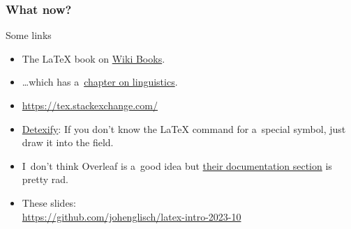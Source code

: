 \documentclass[a4paper,12pt]{beamer}
\begin{document}
\begin{frame}
  \frametitle{What now?}

  \begin{block}{Some links}
    \begin{itemize}
      \item The \LaTeX{} book on \href{https://en.wikibooks.org/wiki/LaTeX}{Wiki Books}.
      \item \dots{}which has a~\href{https://en.wikibooks.org/wiki/LaTeX/Linguistics}{chapter on linguistics}.
      \item \url{https://tex.stackexchange.com/}
      \item \href{https://detexify.kirelabs.org/classify.html}{Detexify}:
        If you don't know the \LaTeX{} command for a~special symbol, just draw
        it into the field.
      \item I~don't think Overleaf is a~good idea but
        \href{https://www.overleaf.com/learn}{their documentation section}
        is pretty rad.
      \item These slides:\\
        {\small\url{https://github.com/johenglisch/latex-intro-2023-10}}
    \end{itemize}
  \end{block}
\end{frame}
\end{document}
